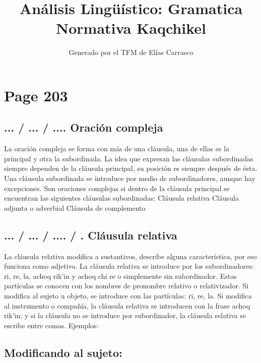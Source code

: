 \documentclass{article}%
\title{Análisis Lingüístico: Gramatica Normativa Kaqchikel}%
\author{Generado por el TFM de Elías Carrasco}%
\begin{document}
%
\normalsize%
\maketitle%
\section{Page 203}%
\label{sec:Page203}%
\subsection{... / ... / .... Oración compleja}%
\label{subsec:.../.../....Oracincompleja}%

%
La oración compleja se forma con más de una cláusula, una de ellas es la principal y %
otra la subordinada. La idea que expresan las cláusulas subordinadas siempre dependen %
de la cláusula principal, su posición es siempre después de ésta. Una cláusula subordinada %
se introduce por medio de subordinadores, aunque hay excepciones. Son oraciones %
complejas si dentro de la cláusula principal se encuentran las siguientes cláusulas %
subordinadas: %
Cláusula relativa %
Cláusula adjunta o adverbial %
Cláusula de complemento %
\subsection{... / ... / .... / . Cláusula relativa}%
\label{subsec:.../.../..../.Clusularelativa}%

%
La cláusula relativa modifica a sustantivos, describe alguna característica, por eso %
funciona como adjetivo. La cláusula relativa se introduce por los subordinadores: ri, %
re, la, achoq rik'in y achoq chi re o simplemente sin subordinador. Estas partículas se %
conocen con los nombres de pronombre relativo o relativizador. Si modifica al sujeto u %
objeto, se introduce con las partículas: ri, re, la. Si modifica al instrumento o compañía, %
la cláusula relativa se introducen con la frase achoq rik'in; y si la cláusula no se %
introduce por subordinador, la cláusula relativa se escribe entre comas. Ejemplos: %
\subsection{Modificando al sujeto:}%
\label{subsec:Modificandoalsujeto}%
\end{document}
